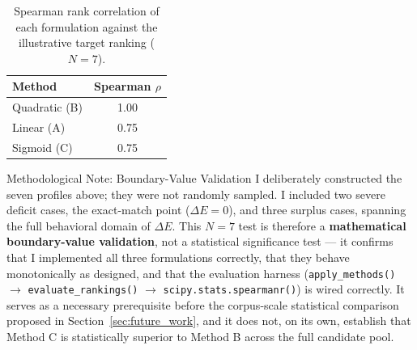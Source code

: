 \begin{table}[htbp]
    \centering
    \caption{Spearman rank correlation of each formulation against the illustrative target ranking ($N=7$).}
    \label{tab:rank_eval_spearman}
    \begin{tabular}{@{}lc@{}}
        \toprule
        \textbf{Method} & \textbf{Spearman} $\rho$ \\
        \midrule
        Quadratic (B) & 1.00 \\
        Linear (A)    & 0.75 \\
        Sigmoid (C)   & 0.75 \\
        \bottomrule
    \end{tabular}
\end{table}

\begin{remarkbox}{Methodological Note: Boundary-Value Validation}
I deliberately constructed the seven profiles above; they were not randomly sampled. I included two severe deficit cases, the exact-match point ($\Delta E = 0$), and three surplus cases, spanning the full behavioral domain of $\Delta E$. This $N=7$ test is therefore a \textbf{mathematical boundary-value validation}, not a statistical significance test --- it confirms that I implemented all three formulations correctly, that they behave monotonically as designed, and that the evaluation harness (\texttt{apply\_methods()} $\to$ \texttt{evaluate\_rankings()} $\to$ \texttt{scipy.stats.spearmanr()}) is wired correctly. It serves as a necessary prerequisite before the corpus-scale statistical comparison proposed in Section~\ref{sec:future_work}, and it does not, on its own, establish that Method C is statistically superior to Method B across the full candidate pool.
\end{remarkbox}
